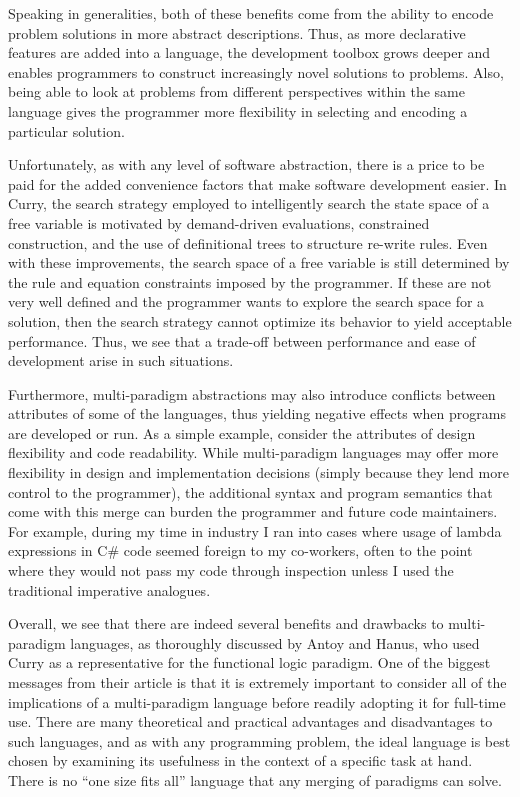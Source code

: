\documentclass[12pt,letterpaper]{article}
\begin{document}
Speaking in generalities, both of these benefits come from the ability to encode problem solutions in more abstract
descriptions. Thus, as more declarative features are added into a language, the development toolbox
grows deeper and enables programmers to construct increasingly novel solutions to problems. Also, being able 
to look at problems from different perspectives within the same language gives the programmer more 
flexibility in selecting and encoding a particular solution. 

Unfortunately, as with any level of software abstraction, there is a price to be paid for the added 
convenience factors that make software development easier. In Curry, the search strategy employed 
to intelligently search the state space of a free variable is motivated by demand-driven evaluations, 
constrained construction, and the use of definitional trees to structure re-write rules. Even with
these improvements, the search space of a free variable is still determined by the rule and equation
constraints imposed by the programmer. If these are not very well defined and the programmer wants to 
explore the search space for a solution, then the search strategy cannot optimize its behavior to yield
acceptable performance. Thus, we see that a trade-off between performance and ease of development arise
in such situations.

Furthermore, multi-paradigm abstractions may also introduce conflicts between attributes of some of the languages, thus yielding negative effects when programs are developed or run. As a simple example, consider the attributes of design 
flexibility and code readability. While multi-paradigm languages may offer more flexibility in design
and implementation decisions (simply because they lend more control to the programmer), the additional
syntax and program semantics that come with this merge can burden the 
programmer and future code maintainers. For example, during my time in industry I ran into cases where 
usage of lambda expressions in C\# code seemed foreign to my co-workers, often to the point where they 
would not pass my code through inspection unless I used the traditional imperative analogues. 

Overall, we see that there are indeed several benefits and drawbacks to multi-paradigm languages, as thoroughly
discussed by Antoy and Hanus, who used Curry as a representative for the functional logic paradigm. One of the biggest messages from their article is that it is extremely important to consider all of the implications of a 
multi-paradigm language before readily adopting it for full-time use. There are many theoretical and 
practical advantages and disadvantages to such languages, and as with any programming problem, 
the ideal language is best chosen by examining its usefulness in the context of a specific task at 
hand. There is no ``one size fits all'' language that any merging of paradigms can solve.



\end{document}
